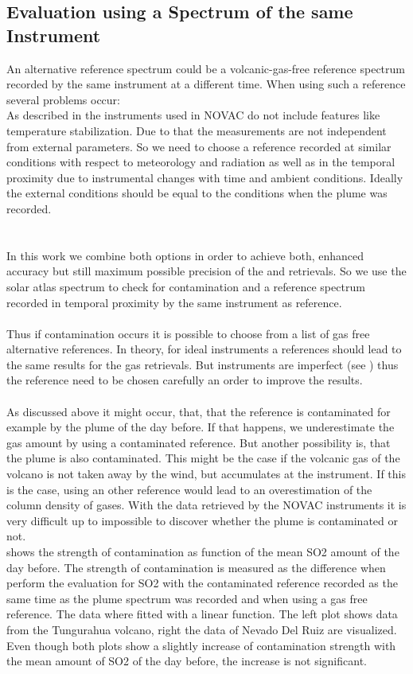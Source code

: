 \subsection*{Evaluation using a Spectrum of the same Instrument}
An alternative reference spectrum could be a volcanic-gas-free reference
spectrum recorded by the same instrument at a different time. When using such a reference several problems occur:\\
As described in  the instruments used in NOVAC do not include features like temperature stabilization. Due to that the measurements are not independent from external parameters. 
So we need to choose a reference recorded at similar conditions with respect to meteorology and	radiation as well as in the temporal proximity due to instrumental changes with time and ambient conditions. Ideally the external conditions should be equal to the conditions when the plume was recorded.\\
\\
%
\\
In this work we combine both options in order to
achieve both, enhanced accuracy but still maximum possible precision of
the  and  retrievals. So we use the solar atlas spectrum to check for 
contamination and a reference spectrum recorded in temporal proximity by the same instrument as reference.\\
\\
Thus if contamination occurs it is possible to choose from a list of gas free alternative references. In theory, for ideal instruments a references should lead to the same results for the gas retrievals. But instruments are imperfect (see ) thus the reference need to be chosen carefully an order to improve the results.\\
%
\\
As discussed above it might occur, that, that the reference is contaminated for example by the plume of the day before. If that happens, we underestimate the gas amount by using a contaminated reference. But another possibility is, that the plume is also contaminated. This might be the case if the volcanic gas of the volcano is not taken away by the wind, but accumulates at the instrument. If this is the case, using an other reference would lead to an overestimation of the column density of gases. With the data retrieved by the NOVAC instruments it is very difficult up to impossible to discover whether the plume is contaminated or not. \\
 shows the strength of contamination as function of the mean SO2 amount of the day before. The strength of contamination is  measured as the difference when perform the evaluation for SO2 with the contaminated reference recorded as the same time as the plume spectrum was recorded and when using a gas free reference. The data where fitted with a linear function. The left plot shows data from the Tungurahua volcano, right the data of Nevado Del Ruiz are visualized. Even though both plots show a slightly increase of contamination strength with the mean amount of SO2 of the day before, the increase is not significant.\\
